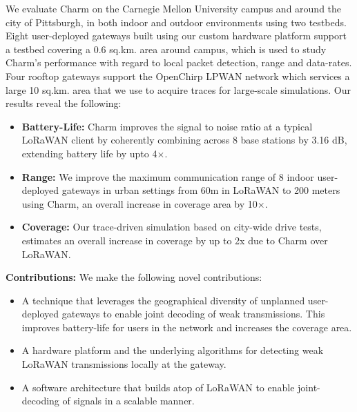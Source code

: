 We evaluate Charm on the Carnegie Mellon University campus and around the city
of Pittsburgh, in both indoor and outdoor environments using two testbeds.
Eight user-deployed gateways built using our custom hardware platform support
a testbed covering a 0.6 sq.km. area around campus, which is used to study
Charm's performance with regard to local packet detection, range and data-rates. Four
rooftop gateways support the OpenChirp LPWAN network which services a large
10 sq.km. area that we use to acquire traces for large-scale simulations. Our
results reveal the following:

\begin{itemize}
    \item {\bf Battery-Life: }Charm improves the signal to noise ratio at a
        typical LoRaWAN client by coherently combining across 8 base stations
        by 3.16 dB, extending battery life by upto 4$\times$.
    \item {\bf Range: } We improve the maximum communication range of 8 indoor
        user-deployed gateways in urban settings from 60m in LoRaWAN to 200
        meters using Charm, an overall increase in coverage area by
        10$\times$.
    \item {\bf Coverage: } Our trace-driven simulation based on city-wide
        drive tests, estimates an overall increase in coverage by up to 2x due
        to Charm over LoRaWAN.
\end{itemize}

\noindent \textbf{Contributions:} We make the following novel contributions:
\begin{itemize}
    \item A technique that leverages the geographical diversity of unplanned
        user-deployed gateways to enable joint decoding of weak transmissions.
        This improves battery-life for users in the network and increases the
        coverage area.
    \item A hardware platform and the underlying algorithms for detecting weak
        LoRaWAN transmissions locally at the gateway.
    \item A software architecture that builds atop of LoRaWAN to enable
        joint-decoding of signals in a scalable manner.
\end{itemize}